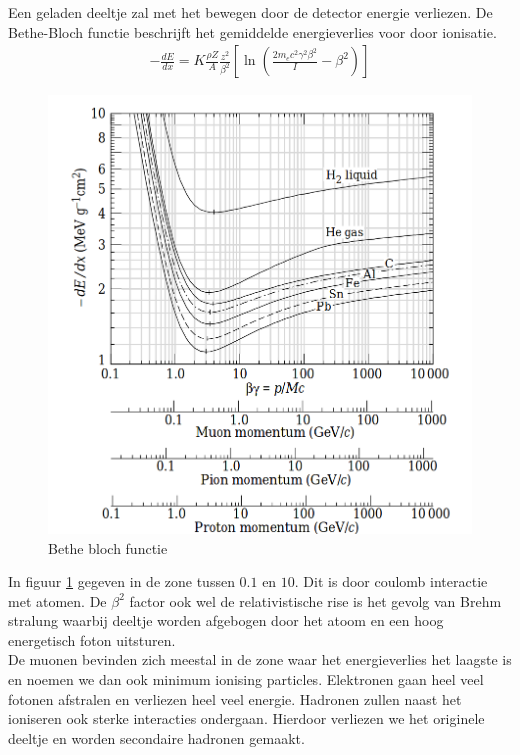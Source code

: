 \documentclass[../main.tex]{subfiles}
\begin{document}
Een geladen deeltje zal met het bewegen door de detector energie verliezen. De Bethe-Bloch functie beschrijft het gemiddelde energieverlies voor door ionisatie.
\begin{equation}
    \begin{aligned}
        \label{eq:bethe_bloch}
        -\frac{dE}{dx}=K\frac{\rho Z}{A}\frac{z^2}{\beta^2}\left[\ln\left(\frac{2m_ec^2\gamma^2\beta^2}{I}-\beta^2\right)\right]
    \end{aligned}
\end{equation}

\begin{figure}[h]
    \centering
    \includegraphics[width=0.8\linewidth]{introduction_and_review/bethe_bloch.png}
    \caption{Bethe bloch functie}%
    \label{fig:bethe_bloch}
\end{figure}
In figuur \ref{fig:bethe_bloch} gegeven in de zone tussen $0.1$ en $10$. Dit is door coulomb interactie met atomen. De $\beta^2$ factor ook wel de relativistische rise is het gevolg van Brehm stralung waarbij deeltje worden afgebogen door het atoom en een hoog energetisch foton uitsturen.\\
De muonen bevinden zich meestal in de zone waar het energieverlies het laagste is en noemen we dan ook minimum ionising particles. Elektronen gaan heel veel fotonen afstralen en verliezen heel veel energie. Hadronen zullen naast het ioniseren ook sterke interacties ondergaan. Hierdoor verliezen we het originele deeltje en worden secondaire hadronen gemaakt.
\end{document}
